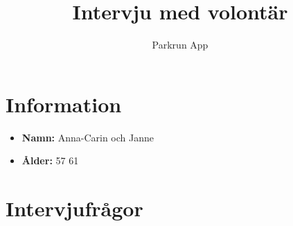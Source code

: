 \documentclass{article}
\title{\textbf{Intervju med volontär}}
\author{Parkrun App}
\date{}
\begin{document}
\maketitle
\thispagestyle{empty}
\section*{Information}
\begin{itemize}[label=]
    \item \textbf{Namn:}  Anna-Carin och Janne 
    \item \textbf{Ålder:} 57 61
\end{itemize}

\section*{Intervjufrågor}
\end{document}
